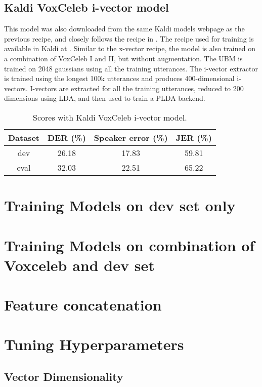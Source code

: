 		\subsection{Kaldi VoxCeleb i-vector model}
			This model was also downloaded from the same Kaldi models webpage as the previous recipe, and closely follows the recipe in \cite{snyder2018x}. The recipe used for training is available in Kaldi at . Similar to the x-vector recipe, the model is also trained on a combination of VoxCeleb I and II, but without augmentation. The UBM is trained on 2048 gaussians using all the training utterances. The i-vector extractor is trained using the longest 100k utterances and produces 400-dimensional i-vectors. I-vectors are extracted for all the training utterances, reduced to 200 dimensions using LDA, and then used to train a PLDA backend.
			
			\begin{table}[h]
				\centering
				\begin{tabular}{|c|c|c|c|}
					\hline
					Dataset & DER (\%) & Speaker error (\%) & JER (\%) \\
					\hline
					dev & 26.18 & 17.83 & 59.81 \\
					\hline
					eval & 32.03 & 22.51 & 65.22 \\
					\hline
				\end{tabular}
				\caption{Scores with Kaldi VoxCeleb i-vector model.}
			\end{table}
									
	\section{Training Models on dev set only}
	
	\section{Training Models on combination of Voxceleb and dev set}
		
	\section{Feature concatenation}
	
	\section{Tuning Hyperparameters}
		\subsection{Vector Dimensionality}
